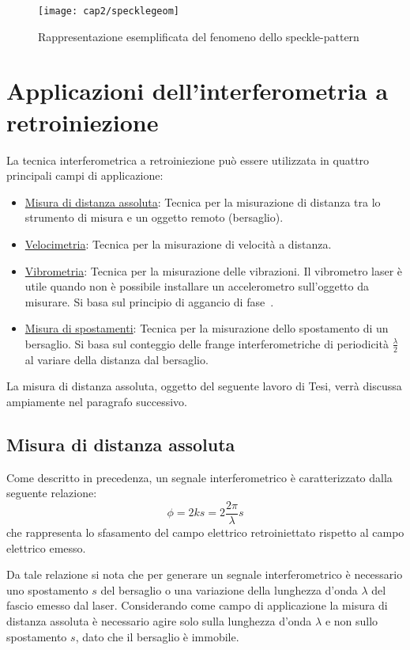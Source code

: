 \begin{figure}[H] 
  \begin{center}
    \texttt{[image: cap2/specklegeom]}
    \caption{Rappresentazione esemplificata del fenomeno dello speckle-pattern}
    \label{specklegeom}
  \end{center}
\end{figure}

\section{Applicazioni dell'interferometria a retroiniezione}
La tecnica interferometrica a retroiniezione può essere utilizzata in quattro principali campi di applicazione:
\begin{itemize}
	\item \underline{Misura di distanza assoluta}: Tecnica per la misurazione di distanza tra lo strumento di misura e un oggetto remoto (bersaglio).
	\item \underline{Velocimetria}: Tecnica per la misurazione di velocità a distanza.
	\item \underline{Vibrometria}: Tecnica per la misurazione delle vibrazioni. Il vibrometro laser è utile quando non è possibile installare un accelerometro sull'oggetto da misurare. Si basa sul principio di aggancio di fase~\cite{thesismelch}.
	\item \underline{Misura di spostamenti}: Tecnica per la misurazione dello spostamento di un bersaglio. Si basa sul conteggio delle frange interferometriche di periodicità $\frac{\lambda}{2}$ al variare della distanza dal bersaglio.
\end{itemize}

La misura di distanza assoluta, oggetto del seguente lavoro di Tesi, verrà discussa ampiamente nel paragrafo successivo.

\subsection{Misura di distanza assoluta}
Come descritto in precedenza, un segnale interferometrico è caratterizzato dalla seguente relazione:
\begin{equation}
	\phi = 2ks = 2 \frac{2\pi}{\lambda}s
	\label{distass}
\end{equation}
che rappresenta lo sfasamento del campo elettrico retroiniettato rispetto al campo elettrico emesso.

Da tale relazione si nota che per generare un segnale interferometrico è necessario uno spostamento $s$ del bersaglio o una variazione della lunghezza d'onda $\lambda$ del fascio emesso dal laser. Considerando come campo di applicazione la misura di distanza assoluta è necessario agire solo sulla lunghezza d'onda $\lambda$ e non sullo spostamento $s$, dato che il bersaglio è immobile.

